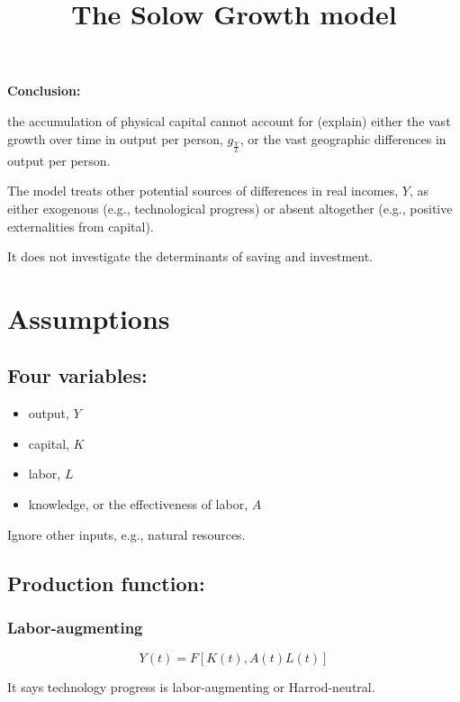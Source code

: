 \documentclass[12pt]{article}
\title{The Solow Growth model}
\author{}
\date{}
\begin{document}
\maketitle

{\textbf {Conclusion:}}

the accumulation of physical capital cannot account for (explain) either the vast 
growth over time in output per person, $ g_{\frac{Y}{L}} $, or the vast geographic 
differences in output per person.

The model treats other potential sources of differences in real incomes, $ Y $, as
either exogenous (e.g., technological progress) or absent altogether (e.g., positive 
externalities from capital).

It does not investigate the determinants of saving and investment.



\section{Assumptions}



\subsection{Four variables: }
\begin{itemize}
\item output, $ Y $
\item capital, $ K $
\item labor, $ L $
\item knowledge, or the effectiveness of labor, $ A $
\end{itemize}


Ignore other inputs, e.g., natural resources.



\subsection{Production function:}

\subsubsection{Labor-augmenting}
\begin{equation*}
Y(t) = F[K(t), A(t)L(t)]
\end{equation*}

It says technology progress is labor-augmenting or Harrod-neutral.
\end{document}

